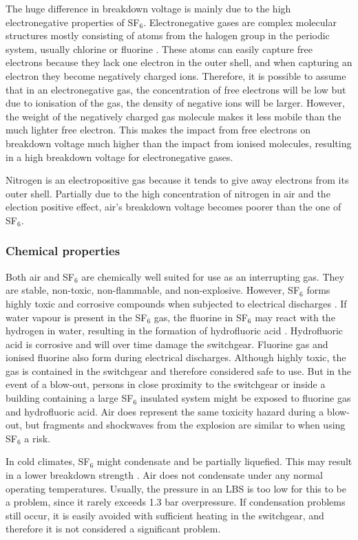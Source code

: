 \documentclass[10pt,a4paper,twoside]{article}
\begin{document}
The huge difference in breakdown voltage is mainly due to the high electronegative properties of SF$_6$. Electronegative gases are complex molecular structures mostly consisting of atoms from the halogen group in the periodic system, usually chlorine or fluorine \cite{bib:TET4160HVIM}. These atoms can easily capture free electrons because they lack one electron in the outer shell, and when capturing an electron they become negatively charged ions. Therefore, it is possible to assume that in an electronegative gas, the concentration of free electrons will be low but due to ionisation of the gas, the density of negative ions will be larger. However, the weight of the negatively charged gas molecule makes it less mobile than the much lighter free electron. This makes the impact from free electrons on breakdown voltage much higher than the impact from ionised molecules, resulting in a high breakdown voltage for electronegative gases.

Nitrogen is an electropositive gas because it tends to give away electrons from its outer shell. Partially due to the high concentration of nitrogen in air and the election positive effect, air's breakdown voltage becomes poorer than the one of SF$_6$.
\newpage
\subsubsection*{Chemical properties}
Both air and SF$_6$ are chemically well suited for use as an interrupting gas. They are stable, non-toxic, non-flammable, and non-explosive. However, SF$_6$ forms highly toxic and corrosive compounds when subjected to electrical discharges \cite{bib:SF6PI}. If water vapour is present in the SF$_6$ gas, the fluorine in SF$_6$ may react with the hydrogen in water, resulting in the formation of hydrofluoric acid \cite{bib:SF6PI}. Hydrofluoric acid is corrosive and will over time damage the switchgear. Fluorine gas and ionised fluorine also form during electrical discharges. Although highly toxic, the gas is contained in the switchgear and therefore considered safe to use. But in the event of a blow-out, persons in close proximity to the switchgear or inside a building containing a large SF$_6$ insulated system might be exposed to fluorine gas and hydrofluoric acid. Air does represent the same toxicity hazard during a blow-out, but fragments and shockwaves from the explosion are similar to when using SF$_6$ a risk.

In cold climates, SF$_6$ might condensate and be partially liquefied. This may result in a lower breakdown strength \cite{bib:SF6PI}. Air does not condensate under any normal operating temperatures. Usually, the pressure in an LBS is too low for this to be a problem, since it rarely exceeds 1.3 bar overpressure. If condensation problems still occur, it is easily avoided with sufficient heating in the switchgear, and therefore it is not considered a significant problem.
\end{document}
